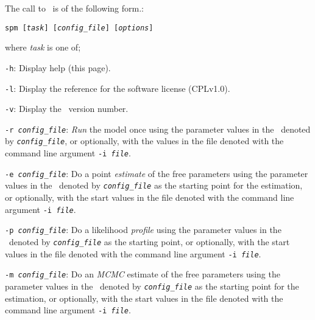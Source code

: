 The call to \SPM\ is of the following form.: 

\texttt{spm [\emph{task}] [\emph{config\_file}] [\emph{options}]}

where \emph{task} is one of;
\begin{description}
\item \texttt{-h}:{\hspace{0.5cm}  Display help (this page).}

\item \texttt{-l}:{\hspace{0.5cm} Display the reference for the software license (CPLv1.0).}

\item \texttt{-v}:{\hspace{0.5cm} Display the \SPM\ version number.}

\item \texttt{-r \emph{config\_file}}:{\hspace{0.5cm} \emph{Run} the model once using the parameter values in the \config\ denoted by \emph{\texttt{config\_file}}, or optionally, with the values in the file denoted with the command line argument \texttt{-i \emph{file}}.}

\item \texttt{-e \emph{config\_file}}:{\hspace{0.5cm} Do a point \emph{estimate} of the free parameters using the parameter values in the \config\ denoted by \emph{\texttt{config\_file}} as the starting point for the estimation, or optionally, with the start values in the file denoted with the command line argument \texttt{-i \emph{file}}.}

\item \texttt{-p \emph{config\_file}}:{\hspace{0.5cm} Do a likelihood \emph{profile} using the parameter values in the \config\ denoted by \emph{\texttt{config\_file}} as the starting point, or optionally, with the start values in the file denoted with the command line argument \texttt{-i \emph{file}}.}

\item \texttt{-m \emph{config\_file}}:{\hspace{0.5cm} Do an \emph{MCMC} estimate of the free parameters using the parameter values in the \config\ denoted by \emph{\texttt{config\_file}} as the starting point for the estimation, or optionally, with the start values in the file denoted with the command line argument \texttt{-i \emph{file}}.}


\end{description}
